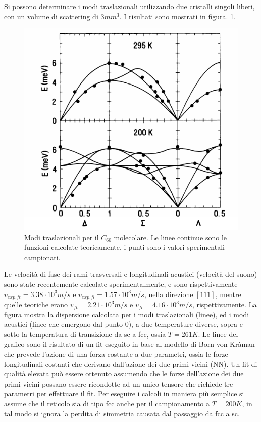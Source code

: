 \documentclass[a4paper,titlepage]{book}
\begin{document}
Si possono determinare i modi traslazionali utilizzando due cristalli singoli liberi, con un volume di scattering di $3 mm^3$. I risultati sono mostrati in figura. \ref{pho}.
\begin{figure}[h!] 
	\centering
	\includegraphics[width=0.7\columnwidth]{phononc60.png}
	\caption{ 	\label{pho}
		Modi traslazionali per il $C_{60}$ molecolare. Le linee continue sono le funzioni calcolate teoricamente, i punti sono i valori sperimentali campionati.
	}
\end{figure}
Le velocità di fase dei  rami trasversali e longitudinali acustici (velocità del suono) sono state recentemente calcolate sperimentalmente, e sono rispettivamente $v_{exp.ft}=3.38 \cdot 10^3 m/s$    e   $v_{exp.fl}=1.57 \cdot 10^3 m/s$, nella direzione $ [111] $, mentre quelle teoriche erano $v_{ft}=2.21 \cdot 10^3 m/s$    e   $v_{fl}=4.16 \cdot 10^3 m/s$, rispettivamente.
La figura mostra la dispersione calcolata per i modi traslazionali (linee), ed i modi acustici (linee che emergono dal punto 0), a due temperature diverse, sopra e sotto la temperatura di transizione da sc a fcc, ossia $T=261 K$.
Le linee del grafico sono il risultato di un fit eseguito in base al modello di Born-von Kràman che prevede l'azione di una forza costante a due parametri, ossia le forze longitudinali costanti che derivano dall'azione dei due primi vicini (NN). Un fit di qualità elevata può essere ottenuto assumendo che le forze dell'azione dei due primi vicini possano essere ricondotte ad un unico tensore che richiede tre parametri per effettuare il fit. Per eseguire i calcoli in maniera più semplice si assume che il reticolo sia di tipo fcc anche per il campionamento a $T=200K$, in tal modo si ignora la perdita di simmetria causata dal passaggio da fcc a sc.
\end{document}
